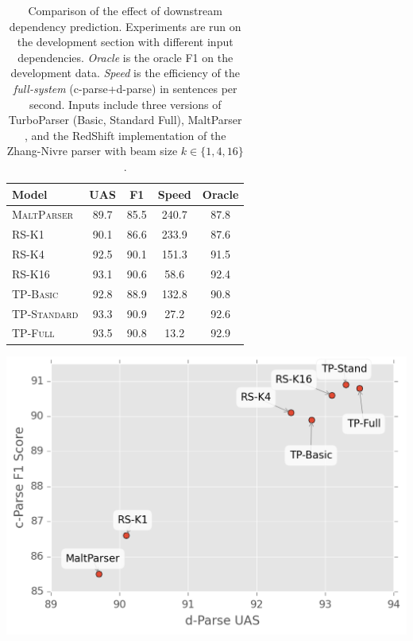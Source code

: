\documentclass[11pt,letterpaper]{article}
\begin{document}
\begin{table}
  \centering
  \small

  \begin{tabular}{|l|cccc|}
    \hline
    Model & UAS  & F1 & Speed  & Oracle  \\
    \hline

    \hline
    \textsc{MaltParser}  & 89.7 & 85.5 & 240.7& 87.8 \\
    \textsc{RS-K1}       & 90.1 & 86.6 & 233.9& 87.6 \\
    \textsc{RS-K4}       & 92.5 & 90.1 & 151.3& 91.5 \\
    \textsc{RS-K16}      & 93.1 & 90.6 & 58.6 & 92.4 \\
    \textsc{TP-Basic}    & 92.8 & 88.9 & 132.8& 90.8 \\
    \textsc{TP-Standard} & 93.3 & 90.9 & 27.2 & 92.6 \\
    \textsc{TP-Full}     & 93.5 & 90.8 & 13.2 & 92.9 \\
    \hline
  \end{tabular}

  \includegraphics[scale=0.4]{../notebooks/parsers}

  \label{tab:oracle}
  \caption{Comparison of the effect of downstream dependency prediction.
    Experiments are run on the development section with different input dependencies. \textit{Oracle} is the oracle F1 on the development data. \textit{Speed} is the efficiency of the \textit{full-system} (c-parse+d-parse) in sentences per second.
    Inputs include three versions of TurboParser \cite{martins2013turning} (Basic, Standard Full), MaltParser \cite{nivre2006maltparser}, 
    and the RedShift implementation of the Zhang-Nivre parser \cite{zhang2011transition} with beam size $k \in \{1, 4, 16\}$. }
\end{table}
\end{document}
